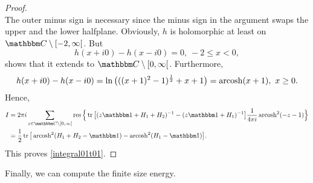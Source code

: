 \begin{proof}
\begin{equation*}
\end{equation*}
The outer minus sign is necessary since the minus sign in the argument swaps the upper and the lower halfplane.
Obviously, $h$ is holomorphic at least on $\C\setminus\interval[open right]{-2}{\infty}$. But
\begin{equation*}
  h(x+i0) - h(x-i0) = 0,\ -2 \leq x < 0 ,
\end{equation*}
shows that it extends to $\C\setminus\interval[open right]{0}{\infty}$. Furthermore,
\begin{equation*}
  h(x+i0) - h(x-i0) 
    = \ln\big( ((x+1)^2-1)^{\frac{1}{2}} + x +1 \big)
    = \operatorname{arcosh}(x+1),\ x\geq 0 .
\end{equation*}
Hence,
\begin{equation*}
\begin{split}
  I & = 2\pi i \sum_{z\in\C\setminus[0,\infty[} \res\Big\{ \tr\big[ (z\id+H_1+H_2)^{-1} - (z\id+H_1)^{-1} \big]
        \frac{1}{4\pi i}\arcosh^2(-z-1)\Big\} \\
    & = \frac{1}{2}  \tr\big[ \arcosh^2(H_1+H_2-\id) - \arcosh^2(H_1-\id) \big] .
\end{split}
\end{equation*}
This proves \eqref{integral01t01}.
\end{proof}

Finally, we can compute the finite size energy.

